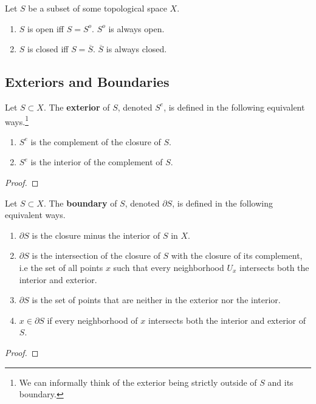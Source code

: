   \begin{lemma}
    Let $S$ be a subset of some topological space $X$. 
    \begin{enumerate}
      \item $S$ is open iff $S = S^{o}$. $S^{o}$ is always open.
      \item $S$ is closed iff $S = \overline{S}$. $\overline{S}$ is always closed. 
    \end{enumerate}
  \end{lemma}

\subsection{Exteriors and Boundaries}

  \begin{definition}[Exteriors]
    Let $S \subset X$. The \textbf{exterior} of $S$, denoted $S^e$, is defined in the following equivalent ways.\footnote{We can informally think of the exterior being strictly outside of $S$ and its boundary.}
    \begin{enumerate}
      \item $S^e$ is the complement of the closure of $S$. 
      \item $S^e$ is the interior of the complement of $S$. 
    \end{enumerate}
  \end{definition}
  \begin{proof}
    
  \end{proof}

  \begin{definition}[Boundary]
    Let $S \subset X$. The \textbf{boundary} of $S$, denoted $\partial S$, is defined in the following equivalent ways. 
    \begin{enumerate}
      \item $\partial S$ is the closure minus the interior of $S$ in $X$. 
      \item $\partial S$ is the intersection of the closure of $S$ with the closure of its complement, i.e the set of all points $x$ such that every neighborhood $U_x$ intersects both the interior and exterior. 
      \item $\partial S$ is the set of points that are neither in the exterior nor the interior. 
      \item $x \in \partial S$ if every neighborhood of $x$ intersects both the interior and exterior of $S$. 
    \end{enumerate}
  \end{definition}
  \begin{proof}
    
  \end{proof}


